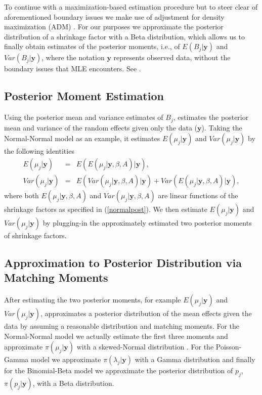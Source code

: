 \documentclass[article]{jss}
\begin{document}
To continue with a maximization-based estimation procedure but to steer clear of aforementioned boundary issues we make use of adjustment for density maximization (ADM) \citep{carl1988, 1997, 2011}. For our purposes we approximate the posterior distribution of a shrinkage factor with a Beta distribution, which allows us to finally obtain estimates of the posterior moments, i.e.,  of $E(B_{j}\vert\textbf{y})$ and $Var(B_{j}\vert\textbf{y})$, where the notation $\textbf{y}$ represents observed data, without the boundary issues that MLE encounters. See \cite{2011}.

\subsection[Posterior moment estimation]{Posterior Moment Estimation}

Using the posterior mean and variance estimates of $B_{j}$,  estimates the posterior mean and variance of the random effects given only the data ($\textbf{y}$). Taking the Normal-Normal model as an example, it estimates $E(\mu_{j}\vert \textbf{y})$ and $Var(\mu_{j}\vert \textbf{y})$ by the following identities
\begin{eqnarray}
E(\mu_{j}\vert \textbf{y}) & = & E(E(\mu_{j}\vert \textbf{y}, \beta, A)\vert \textbf{y}), \\
Var(\mu_{j}\vert \textbf{y}) & = & E(Var(\mu_{j}\vert \textbf{y}, \beta, A)\vert \textbf{y})+Var(E(\mu_{j}\vert \textbf{y}, \beta, A)\vert \textbf{y}),
\end{eqnarray}  
where both $E(\mu_{j}\vert \textbf{y}, \beta, A)$ and $Var(\mu_{j}\vert \textbf{y}, \beta, A)$ are linear functions of the shrinkage factors as specified in (\ref{normalpost}). We then estimate $E(\mu_{j}\vert \textbf{y})$ and $Var(\mu_{j}\vert \textbf{y})$ by plugging-in the approximately estimated two posterior moments of shrinkage factors.

\subsection[Approximation to posterior distribution by moment matching]{Approximation to Posterior Distribution via Matching Moments}
After estimating the two posterior moments, for example $E(\mu_{j}\vert \textbf{y})$ and $Var(\mu_{j}\vert \textbf{y})$,  approximates a posterior distribution of the mean effects given the data by assuming a reasonable distribution and matching moments. For the Normal-Normal model we actually estimate the first three moments and approximate $\pi(\mu_{j}\vert \textbf{y})$ with a skewed-Normal distribution \citep{sn2013}. For the Poisson-Gamma model we approximate $\pi(\lambda_{j}\vert \textbf{y})$ with a Gamma distribution and finally for the Binomial-Beta model we approximate the posterior distribution of $p_{j}$, $\pi(p_{j}\vert \textbf{y})$, with a Beta distribution.
\end{document}
